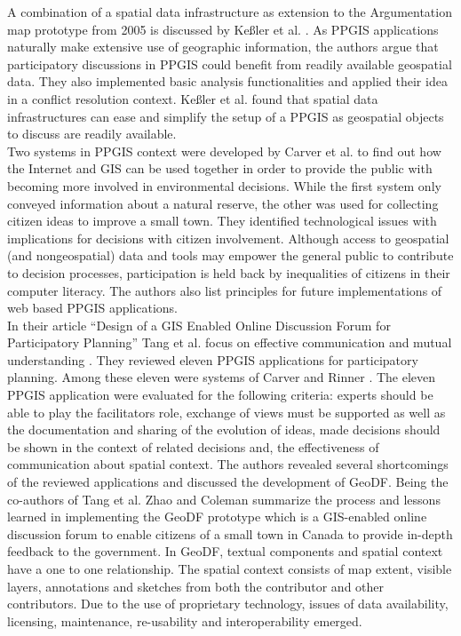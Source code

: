 A combination of a spatial data infrastructure as extension to the Argumentation map prototype from 2005 is discussed by Ke{\ss}ler et al. \cite{Kessler2005_Conflict_Resolution}. As PPGIS applications naturally make extensive use of geographic information, the authors argue that participatory discussions in PPGIS could benefit from readily available geospatial data. They also implemented basic analysis functionalities and applied their idea in a conflict resolution context. Ke{\ss}ler et al. found that spatial data infrastructures can ease and simplify the setup of a PPGIS as geospatial objects to discuss are readily available.\\
Two systems in PPGIS context were developed by Carver et al. \cite{Carver2001_PPGIS_Cyberdemocracy} to find out how the Internet and GIS can be used together in order to provide the public with becoming more involved in environmental decisions. While the first system only conveyed information about a natural reserve, the other was used for collecting citizen ideas to improve a small town. They identified technological issues with implications for decisions with citizen involvement. Although access to geospatial (and nongeospatial) data and tools may empower the general public to contribute to decision processes, participation is held back by inequalities of citizens in their computer literacy. The authors also list principles for future implementations of web based PPGIS applications.\\
In their article ``Design of a GIS Enabled Online Discussion Forum for Participatory Planning'' Tang et al. focus on effective communication and mutual understanding \cite{Tang2005_PPGIS_discussion_forum}. They reviewed eleven PPGIS applications for participatory planning. Among these eleven were systems of Carver \cite{Carver2001_PPGIS_Cyberdemocracy} and Rinner \cite{Rinner_ArgumentationMaps,Kessler2005_ArgumentationMapPrototype}. The eleven PPGIS application were evaluated for the following criteria: experts should be able to play the facilitators role, exchange of views must be supported as well as the documentation and sharing of the evolution of ideas, made decisions should be shown in the context of related decisions and, the effectiveness of communication about spatial context. The authors revealed several shortcomings of the reviewed applications and discussed the development of GeoDF. Being the co-authors of Tang et al. \cite{Tang2005_PPGIS_discussion_forum} Zhao and Coleman \cite{zhao2006geodf} summarize the process and lessons learned in implementing the GeoDF prototype which is a GIS-enabled online discussion forum to enable citizens of a small town in Canada to provide in-depth feedback to the government. In GeoDF, textual components and spatial context have a one to one relationship. The spatial context consists of map extent, visible layers, annotations and sketches from both the contributor and other contributors. Due to the use of proprietary technology, issues of data availability, licensing, maintenance, re-usability and interoperability emerged.\\
